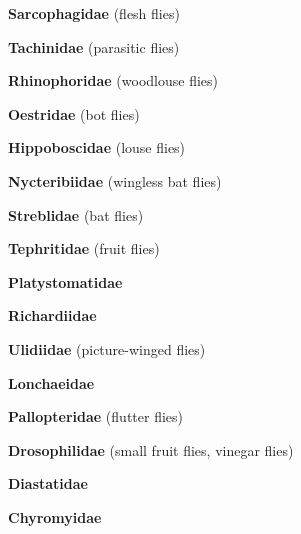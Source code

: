 \documentclass[letterpaper,10pt]{article}
\begin{document}
{%
\makebox[0.6cm]{}  \textbf{Sarcophagidae} (flesh flies) \par
\makebox[0.6cm]{}  \textbf{Tachinidae} (parasitic flies) \par
\makebox[0.6cm]{}  \textbf{Rhinophoridae} (woodlouse flies) \par
\makebox[0.6cm]{}  \textbf{Oestridae} (bot flies) \par
\makebox[0.6cm]{}  \textbf{Hippoboscidae} (louse flies) \par
\makebox[0.6cm]{}  \textbf{Nycteribiidae} (wingless bat flies) \par
\makebox[0.6cm]{}  \textbf{Streblidae} (bat flies) \par
\makebox[0.6cm]{}  \textbf{Tephritidae} (fruit flies) \par
\makebox[0.6cm]{}  \textbf{Platystomatidae} \par
\makebox[0.6cm]{}  \textbf{Richardiidae} \par
\makebox[0.6cm]{}  \textbf{Ulidiidae} (picture-winged flies) \par
\makebox[0.6cm]{}  \textbf{Lonchaeidae} \par
\makebox[0.6cm]{}  \textbf{Pallopteridae} (flutter flies) \par
\makebox[0.6cm]{}  \textbf{Drosophilidae} (small fruit flies, vinegar flies) \par
\makebox[0.6cm]{}  \textbf{Diastatidae} \par
\makebox[0.6cm]{}  \textbf{Chyromyidae} \par
}
\end{document}

